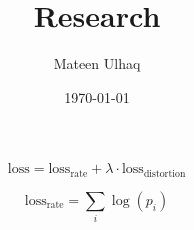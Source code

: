 \documentclass[12pt]{extarticle}
\title{Research}
\author{Mateen Ulhaq}
\date{\today}
\begin{document}
\maketitle

\[ \textrm{loss} = \textrm{loss}_\textrm{rate} + \lambda \cdot
\textrm{loss}_\textrm{distortion} \]

\[ \textrm{loss}_\textrm{rate} = \sum_i \log(p_i) \]
\end{document}
